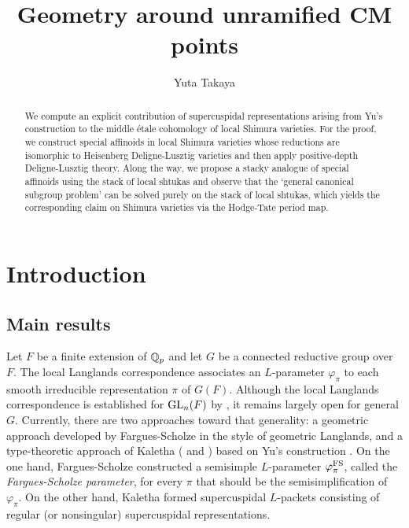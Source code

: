 \documentclass[12pt,reqno]{amsart}
\title{Geometry around unramified CM points}
\author{Yuta Takaya}
\begin{document}
\begin{abstract}
    We compute an explicit contribution of supercuspidal representations arising from Yu's construction to the middle \'{e}tale cohomology of local Shimura varieties. For the proof, we construct special affinoids in local Shimura varieties whose reductions are isomorphic to Heisenberg Deligne-Lusztig varieties and then apply positive-depth Deligne-Lusztig theory. Along the way, we propose a stacky analogue of special affinoids using the stack of local shtukas and observe that the `general canonical subgroup problem' can be solved purely on the stack of local shtukas, which yields the corresponding claim on Shimura varieties via the Hodge-Tate period map. 
\end{abstract}

\maketitle
\setcounter{tocdepth}{2}
\tableofcontents

\section*{Introduction}

\subsection{Main results}

Let $F$ be a finite extension of $\mathbb{Q}_p$ and let $G$ be a connected reductive group over $F$. The local Langlands correspondence associates an $L$-parameter $\varphi_\pi$ to each smooth irreducible representation $\pi$ of $G(F)$. Although the local Langlands correspondence is established for ${\operatorname{GL}}_n(F)$ by \cite{HT01}, it remains largely open for general $G$. Currently, there are two approaches toward that generality: a geometric approach developed by Fargues-Scholze \cite{FS24} in the style of geometric Langlands, and a type-theoretic approach of Kaletha (\cite{Kal19} and \cite{Kal21}) based on Yu's construction \cite{Yu01}. On the one hand, Fargues-Scholze constructed a semisimple $L$-parameter $\varphi_\pi^{\operatorname{FS}}$, called the \textit{Fargues-Scholze parameter}, for every $\pi$ that should be the semisimplification of $\varphi_\pi$. On the other hand, Kaletha formed supercuspidal $L$-packets consisting of regular (or nonsingular) supercuspidal representations. 
\end{document}
